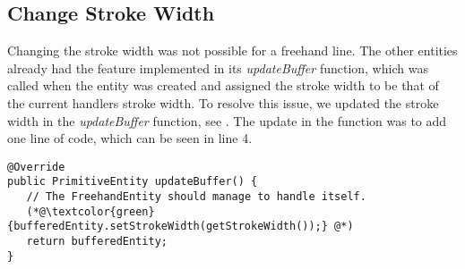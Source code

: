 \subsection{Change Stroke Width}
Changing the stroke width was not possible for a freehand line.
The other entities already had the feature implemented in its \textit{updateBuffer} function, which was called when the entity was created and assigned the stroke width to be that of the current handlers stroke width.
To resolve this issue, we updated the stroke width in the \textit{updateBuffer} function, see .
The update in the function was to add one line of code, which can be seen in line 4.

\begin{lstlisting}[caption={Updated \textit{updateBuffer} function}, label=list:updateBuffer]
@Override
public PrimitiveEntity updateBuffer() {
   // The FreehandEntity should manage to handle itself.
   (*@\textcolor{green}{bufferedEntity.setStrokeWidth(getStrokeWidth());} @*)
   return bufferedEntity;
}
\end{lstlisting}